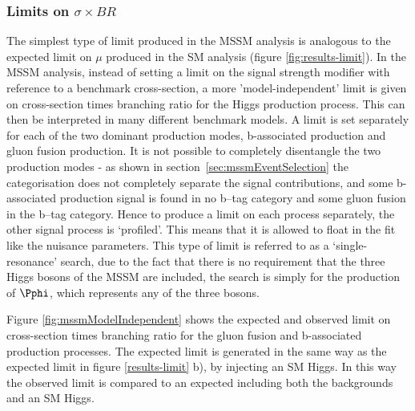 \subsubsection{Limits on $\sigma \times BR$}

The simplest type of limit produced in the \ac{MSSM} analysis is analogous to the 
expected limit on $\mu$ produced in the \ac{SM} analysis (figure
\ref{fig:results-limit}). In the \ac{MSSM} analysis, instead of setting a limit
on the signal strength modifier with reference to a benchmark cross-section, a
more 'model-independent' limit is given on cross-section times branching ratio
for the Higgs production process. This can then be interpreted in many different
benchmark models. A limit is set separately for each of the two dominant production modes,
b-associated production and gluon fusion production. It is not possible to
completely disentangle the two production modes - as shown in
section~\ref{sec:mssmEventSelection} the categorisation does not completely
separate the signal contributions, and some b-associated production signal is
found in no b--tag category and some gluon fusion in the b--tag category. Hence
to produce a limit on each process separately, the other signal process is
`profiled'. This means that it is allowed to float in the fit like the nuisance
parameters. This type of limit is referred to as a `single-resonance' search,
due to the fact that there is no requirement that the three Higgs bosons of the
\ac{MSSM} are included, the search is simply for the production of $\Pphi$,
which represents any of the three bosons.

Figure \ref{fig:mssmModelIndependent} shows the expected and observed limit on
cross-section times branching ratio for the gluon fusion and b-associated
production processes. The expected limit is generated in the same way as the
expected limit in figure \ref{results-limit} b), by injecting an \ac{SM} Higgs.
In this way the observed limit is compared to an expected including both the
backgrounds and an \ac{SM} Higgs. 

